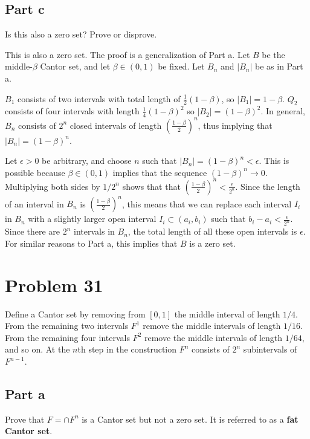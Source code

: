 \documentclass{article}
\begin{document}
\subsection*{Part c}

Is this also a zero set? Prove or disprove.

This is also a zero set. The proof is a generalization of Part a. Let $B$ be the middle-$\beta$ Cantor set, and let $\beta \in (0, 1)$ be fixed. Let $B_n$ and $|B_n|$ be as in Part a.

$B_1$ consists of two intervals with total length of $\frac{1}{2}(1-\beta)$, so $|B_1| = 1-\beta$. $Q_2$ consists of four intervals with length $\frac{1}{4}(1-\beta)^2$ so $|B_2| = (1-\beta)^2$. In general, $B_n$ consists of $2^n$ closed intervals of length $(\frac{1-\beta}{2})^n$, thus implying that $|B_n| = (1-\beta)^n$.

Let $\epsilon > 0$ be arbitrary, and choose $n$ such that $|B_n| = (1-\beta)^n < \epsilon$. This is possible because $\beta \in (0, 1)$ implies that the sequence $(1-\beta)^n \rightarrow 0$. Multiplying both sides by $1/2^n$ shows that that $(\frac{1-\beta}{2})^n < \frac{\epsilon}{2^n}$. Since the length of an interval in $B_n$ is $(\frac{1-\beta}{2})^n$, this means that we can replace each interval $I_i$ in $B_n$ with a slightly larger open interval $I_i \subset(a_i, b_i)$ such that $b_i - a_i < \frac{\epsilon}{2^n}$. Since there are $2^n$ intervals in $B_n$, the total length of all these open intervals is $\epsilon$. For similar reasons to Part a, this implies that $B$ is a zero set.

\section*{Problem 31}

Define a Cantor set by removing from $[0, 1]$ the middle interval of length $1/4$. From the remaining two intervals $F^1$ remove the middle intervals of length $1/16$. From the remaining four intervals $F^2$ remove the middle intervals of length $1/64$, and so on. At the $n$th step in the construction $F^n$ consists of $2^n$ subintervals of $F^{n-1}$.

\subsection*{Part a}

Prove that $F = \cap F^n$ is a Cantor set but not a zero set. It is referred to as a \textbf{fat Cantor set}.
\end{document}
